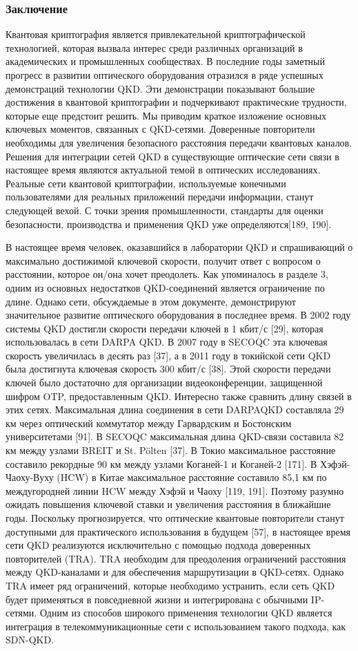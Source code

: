 \subsubsection{Заключение}
Квантовая криптография является привлекательной криптографической технологией, которая вызвала интерес среди различных организаций в академических и промышленных сообществах. В последние годы заметный прогресс в развитии оптического оборудования отразился в ряде успешных демонстраций технологии QKD. Эти демонстрации показывают большие достижения в квантовой криптографии и подчеркивают практические трудности, которые еще предстоит решить.
Мы приводим краткое изложение основных ключевых моментов, связанных с QKD-сетями. Доверенные повторители необходимы для увеличения безопасного расстояния передачи квантовых каналов. Решения для интеграции сетей QKD в существующие оптические сети связи в настоящее время являются актуальной темой в оптических исследованиях. Реальные сети квантовой криптографии, используемые конечными пользователями для реальных приложений передачи информации, станут следующей вехой. С точки зрения промышленности, стандарты для оценки безопасности, производства и применения QKD уже определяются[189, 190].

В настоящее время человек, оказавшийся в лаборатории QKD и спрашивающий о максимально достижимой ключевой скорости, получит ответ с вопросом о расстоянии, которое он/она хочет преодолеть.
Как упоминалось в разделе 3, одним из основных недостатков QKD-соединений является ограничение по длине. Однако сети, обсуждаемые в этом документе, демонстрируют значительное развитие оптического оборудования в последнее время. В 2002 году системы QKD достигли скорости передачи ключей в 1 кбит/с [29], которая использовалась в сети DARPA QKD. В 2007 году в SECOQC эта ключевая скорость увеличилась в десять раз [37], а в 2011 году в токийской сети QKD была достигнута ключевая скорость 300 кбит/с [38]. Этой скорости передачи ключей было достаточно для организации видеоконференции, защищенной шифром OTP, предоставленным QKD. Интересно также сравнить длину связей в этих сетях. Максимальная длина соединения в сети DARPAQKD составляла 29 км через оптический коммутатор между Гарвардским и Бостонским университетами [91]. В SECOQC максимальная длина QKD-связи составила 82 км между узлами BREIT и St. Pölten [37]. В Токио максимальное расстояние составило рекордные 90 км между узлами Коганей-1 и Коганей-2 [171]. В Хэфэй-Чаоху-Вуху (HCW) в Китае максимальное расстояние составило
85,1 км по междугородней линии HCW между Хэфэй и Чаоху [119, 191].
Поэтому разумно ожидать повышения ключевой ставки и увеличения расстояния в ближайшие годы.
Поскольку прогнозируется, что оптические квантовые повторители станут доступными для практического использования в будущем [57], в настоящее время сети QKD реализуются исключительно с помощью подхода доверенных повторителей (TRA). TRA необходим для преодоления ограничений расстояния между QKD-каналами и для обеспечения маршрутизации в QKD-сетях. Однако TRA имеет ряд ограничений, которые необходимо устранить, если сеть QKD будет применяться в повседневной жизни и интегрирована с обычными IP-сетями.
Одним из способов широкого применения технологии QKD является интеграция в телекоммуникационные сети с использованием такого подхода, как SDN-QKD.
